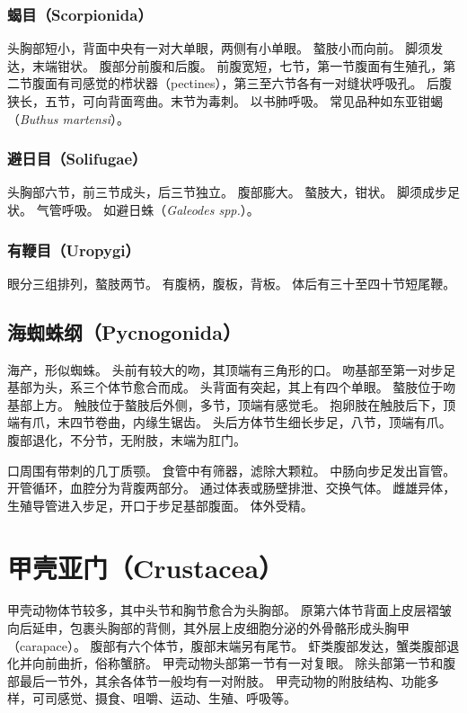 \documentclass[11pt]{article}
\begin{document}
\subsubsection{蝎目（Scorpionida）}
头胸部短小，背面中央有一对大单眼，两侧有小单眼。
螯肢小而向前。
脚须发达，末端钳状。
腹部分前腹和后腹。
前腹宽短，七节，第一节腹面有生殖孔，第二节腹面有司感觉的栉状器（pectines），第三至六节各有一对缝状呼吸孔。
后腹狭长，五节，可向背面弯曲。末节为毒刺。
以书肺呼吸。
常见品种如东亚钳蝎（\textit{Buthus martensi}）。

\subsubsection{避日目（Solifugae）}
头胸部六节，前三节成头，后三节独立。
腹部膨大。
螯肢大，钳状。
脚须成步足状。
气管呼吸。
如避日蛛（\textit{Galeodes spp.}）。

\subsubsection{有鞭目（Uropygi）}
眼分三组排列，螯肢两节。
有腹柄，腹板，背板。
体后有三十至四十节短尾鞭。

\subsection{海蜘蛛纲（Pycnogonida）}
海产，形似蜘蛛。
头前有较大的吻，其顶端有三角形的口。
吻基部至第一对步足基部为头，系三个体节愈合而成。
头背面有突起，其上有四个单眼。
螯肢位于吻基部上方。
触肢位于螯肢后外侧，多节，顶端有感觉毛。
抱卵肢在触肢后下，顶端有爪，末四节卷曲，内缘生锯齿。
头后方体节生细长步足，八节，顶端有爪。
腹部退化，不分节，无附肢，末端为肛门。

\newline

口周围有带刺的几丁质颚。
食管中有筛器，滤除大颗粒。
中肠向步足发出盲管。
开管循环，血腔分为背腹两部分。
通过体表或肠壁排泄、交换气体。
雌雄异体，生殖导管进入步足，开口于步足基部腹面。
体外受精。

\section{甲壳亚门（Crustacea）}
甲壳动物体节较多，其中头节和胸节愈合为头胸部。
原第六体节背面上皮层褶皱向后延申，包裹头胸部的背侧，其外层上皮细胞分泌的外骨骼形成头胸甲（carapace）。
腹部有六个体节，腹部末端另有尾节。
虾类腹部发达，蟹类腹部退化并向前曲折，俗称蟹脐。
甲壳动物头部第一节有一对复眼。
除头部第一节和腹部最后一节外，其余各体节一般均有一对附肢。
甲壳动物的附肢结构、功能多样，可司感觉、摄食、咀嚼、运动、生殖、呼吸等。
\end{document}
